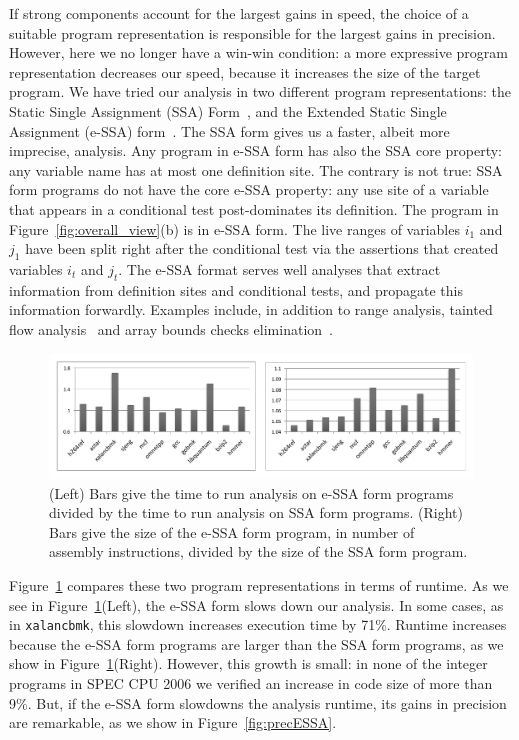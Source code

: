 \documentclass{paper}
\begin{document}
If strong components account for the largest gains in speed, the choice of
a suitable program representation is responsible for the largest gains in
precision.
However, here we no longer have a win-win condition: a more expressive
program representation decreases our speed, because it increases the
size of the target program.
We have tried our analysis in two different program representations: the
Static Single Assignment (SSA) Form~\cite{Cytron91}, and the Extended Static
Single Assignment (e-SSA) form~\cite{Bodik00}.
The SSA form gives us a faster, albeit more imprecise, analysis.
Any program in e-SSA form has also the SSA core property: any variable name
has at most one definition site.
The contrary is not true: SSA form programs do not have the core e-SSA
property: any use site of a variable that appears in a conditional test
post-dominates its definition.
The program in Figure~\ref{fig:overall_view}(b) is in e-SSA form.
The live ranges of variables $i_1$ and $j_1$ have been split right after the
conditional test via the assertions that created variables $i_t$ and $j_t$.
The e-SSA format serves well analyses that extract information from definition
sites and conditional tests, and propagate this information forwardly.
Examples include, in addition to range analysis, tainted flow
analysis~\cite{Rimsa11} and array bounds checks elimination~\cite{Bodik00}.

\begin{figure}[t!]
\begin{center}
\includegraphics[width=1\textwidth]{images/impactESSA}
\end{center}
\caption{\label{fig:impactESSA}
(Left) Bars give the time to run analysis on e-SSA form programs divided by
the time to run analysis on SSA form programs.
(Right) Bars give the size of the e-SSA form program, in number of
assembly instructions, divided by the size of the SSA form program.}
\end{figure}

Figure~\ref{fig:impactESSA} compares these two program representations in
terms of runtime.
As we see in Figure~\ref{fig:impactESSA}(Left), the e-SSA form slows down our
analysis.
In some cases, as in \texttt{xalancbmk}, this slowdown increases execution
time by 71\%.
Runtime increases because the e-SSA form programs are larger than the SSA
form programs, as we show in Figure~\ref{fig:impactESSA}(Right).
However, this growth is small: in none of the integer programs in SPEC
CPU 2006 we verified an increase in code size of more than 9\%.
But, if the e-SSA form slowdowns the analysis runtime, its gains in precision
are remarkable, as we show in Figure~\ref{fig:precESSA}.
\end{document}
